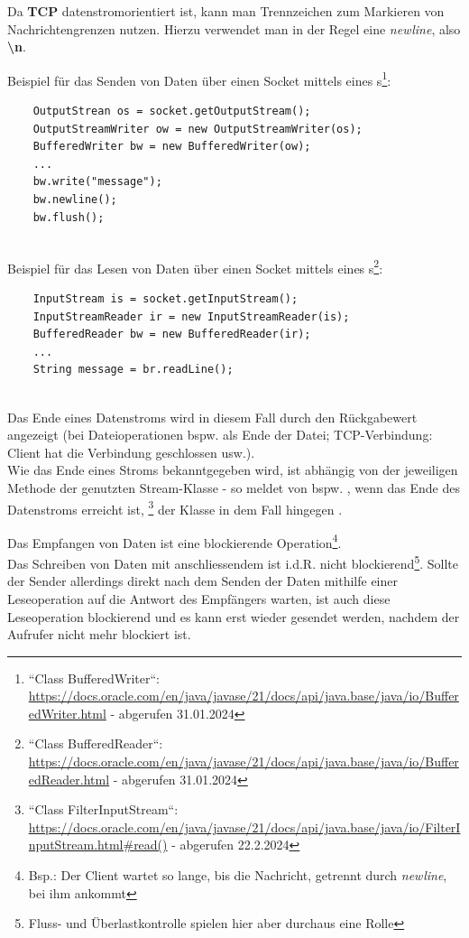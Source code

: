 \noindent
Da \textbf{TCP} datenstromorientiert ist, kann man Trennzeichen zum Markieren von Nachrichtengrenzen nutzen.
Hierzu verwendet man in der Regel eine \textit{newline}, also \textbf{\textbackslash n}.

Beispiel für das Senden von Daten über einen Socket mittels eines s\footnote{
    ``Class BufferedWriter``: \url{https://docs.oracle.com/en/java/javase/21/docs/api/java.base/java/io/BufferedWriter.html} - abgerufen 31.01.2024
}:
\begin{verbatim}
    OutputStrean os = socket.getOutputStream();
    OutputStreamWriter ow = new OutputStreamWriter(os);
    BufferedWriter bw = new BufferedWriter(ow);
    ...
    bw.write("message");
    bw.newline();
    bw.flush();
\end{verbatim}\\

Beispiel für das Lesen von Daten über einen Socket mittels eines s\footnote{
    ``Class BufferedReader``: \url{https://docs.oracle.com/en/java/javase/21/docs/api/java.base/java/io/BufferedReader.html} - abgerufen 31.01.2024
}:
\begin{verbatim}
    InputStream is = socket.getInputStream();
    InputStreamReader ir = new InputStreamReader(is);
    BufferedReader bw = new BufferedReader(ir);
    ...
    String message = br.readLine();
\end{verbatim}\\

\noindent
Das Ende eines Datenstroms wird in diesem Fall durch den Rückgabewert  angezeigt (bei Dateioperationen {bspw.} als Ende der Datei; TCP-Verbindung: Client hat die Verbindung geschlossen usw.).\\
Wie das Ende eines Stroms bekanntgegeben wird, ist abhängig von der jeweiligen Methode der genutzten Stream-Klasse - so meldet  von  bspw. , wenn das Ende des Datenstroms erreicht ist, \footnote{
    ``Class FilterInputStream``: \url{https://docs.oracle.com/en/java/javase/21/docs/api/java.base/java/io/FilterInputStream.html#read()} - abgerufen 22.2.2024
} der Klasse  in dem Fall hingegen .\\

\begin{tcolorbox}[enlarge top by=0.5cm,enlarge bottom by=0.5cm]
    Das Empfangen von Daten ist eine blockierende Operation\footnote{Bsp.: Der Client wartet so lange, bis die Nachricht, getrennt durch \textit{newline}, bei ihm ankommt}.\\
    Das Schreiben von Daten mit anschliessendem  ist i.d.R. nicht blockierend\footnote{
    Fluss- und Überlastkontrolle spielen hier aber durchaus eine Rolle
    }.
    Sollte der Sender allerdings direkt nach dem Senden der Daten mithilfe einer Leseoperation auf die Antwort des Empfängers warten, ist auch diese Leseoperation blockierend und es kann erst wieder gesendet werden, nachdem der Aufrufer nicht mehr blockiert ist.
\end{tcolorbox}

